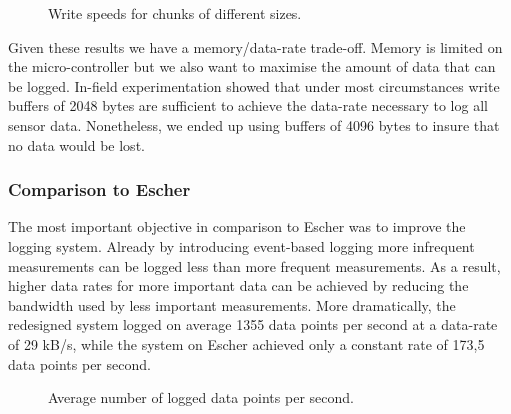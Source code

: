 \begin{figure}[H]
\centering
{}
\caption{Write speeds for chunks of different sizes.}
\label{fig:write_speed}
\end{figure}

Given these results we have a memory/data-rate trade-off. Memory is limited on the micro-controller but we also want to maximise the amount of data that can be logged. In-field experimentation showed that under most circumstances write buffers of 2048 bytes are sufficient to achieve the data-rate necessary to log all sensor data. Nonetheless, we ended up using buffers of 4096 bytes to insure that no data would be lost.

\subsubsection{Comparison to Escher}

The most important objective in comparison to Escher was to improve the logging system. Already by introducing event-based logging more infrequent measurements can be logged less than more frequent measurements. As a result, higher data rates for more important data can be achieved by reducing the bandwidth used by less important measurements. More dramatically, the redesigned system logged on average 1355 data points per second at a data-rate of 29 kB/s, while the system on Escher achieved only a constant rate of 173,5 data points per second.

\begin{figure}[H]
\centering
{}
\caption{Average number of logged data points per second.}
\label{fig:write_speed}
\end{figure}

